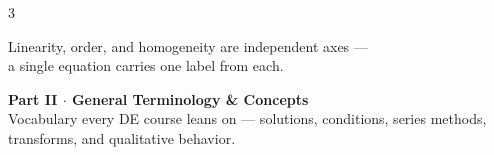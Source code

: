 \documentclass[10pt]{article}
\begin{document}
\begin{multicols}{3}
\begin{tcolorbox}[blanker,before skip=4pt]
\centering\footnotesize\color{ink!70}
\sffamily Linearity, order, and homogeneity are independent axes ---\\
a single equation carries one label from each.
\end{tcolorbox}

\end{multicols}

\newpage

\begin{tcolorbox}[enhanced, colback=ink, colframe=ink, sharp corners,
  boxrule=0pt, left=12pt, right=12pt, top=5pt, bottom=5pt]
  \color{white}
  {\sffamily\bfseries\LARGE Part II \textmd{\large $\cdot$ General Terminology \& Concepts}}\\[2pt]
  {\sffamily\footnotesize Vocabulary every DE course leans on --- solutions, conditions, series methods, transforms, and qualitative behavior.}
\end{tcolorbox}
\vspace{2pt}
\end{document}
